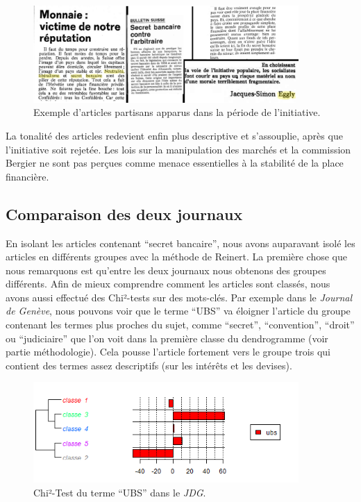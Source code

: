 \documentclass[11pt]{article}
\begin{document}
\begin{figure}
\centering
\includegraphics[width=0.9\textwidth ]{analysis/propaganda_collage.png}
\caption{\label{propagande} Exemple d'articles partisans apparus dans la
période de l'initiative.}
\end{figure}

La tonalité des articles redevient enfin plus descriptive et
s'assouplie, après que l'initiative soit rejetée. Les lois sur la
manipulation des marchés et la commission Bergier ne sont pas perçues
comme menace essentielles à la stabilité de la place financière.

\hypertarget{comparaison-des-deux-journaux}{%
\subsection{Comparaison des deux
journaux}\label{comparaison-des-deux-journaux}}

En isolant les articles contenant ``secret bancaire'', nous avons
auparavant isolé les articles en différents groupes avec la méthode de
Reinert. La première chose que nous remarquons est qu'entre les deux
journaux nous obtenons des groupes différents. Afin de mieux comprendre
comment les articles sont classés, nous avons aussi effectué des
Chi²-tests sur des mots-clés. Par exemple dans le \emph{Journal de
Genève}, nous pouvons voir que le terme ``UBS'' va éloigner l'article du
groupe contenant les termes plus proches du sujet, comme ``secret'',
``convention'', ``droit'' ou ``judiciaire'' que l'on voit dans la
première classe du dendrogramme (voir partie méthodologie). Cela pousse
l'article fortement vers le groupe trois qui contient des termes assez
descriptifs (sur les intérêts et les devises).

\begin{figure}
\centering
\includegraphics[width=0.9\textwidth ]{analysis/chiubs.png}
\caption{Chi²-Test du terme ``UBS'' dans le \emph{JDG}.}
\end{figure}
\end{document}
